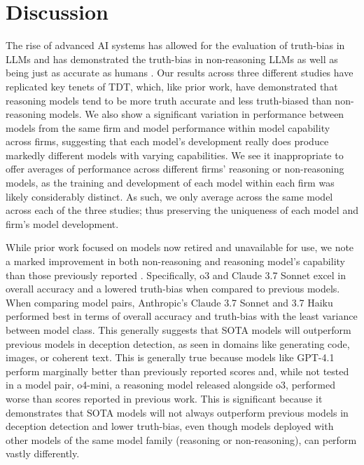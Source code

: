 \documentclass{article}
\begin{document}
\section{Discussion}
\label{sec:discussion}

The rise of advanced AI systems has allowed for the evaluation of truth-bias in LLMs and has demonstrated the truth-bias in non-reasoning LLMs as well as being just as accurate as humans \citep{markowitz_generative_2024}. Our results across three different studies have replicated key tenets of TDT, which, like prior work, have demonstrated that reasoning models tend to be more truth accurate and less truth-biased than non-reasoning models. We also show a significant variation in performance between models from the same firm and  model performance within model capability across firms, suggesting that each model's development really does produce markedly different models with varying capabilities. We see it inappropriate to offer averages of performance across different firms' reasoning or non-reasoning models, as the training and development of each model within each firm was likely considerably distinct. As such, we only average across the same model across each of the three studies; thus preserving the uniqueness of each model and firm's model development.

While prior work focused on models now retired and unavailable for use, we note a marked improvement in both non-reasoning and reasoning model's capability than those previously reported \citep{markowitz_generative_2024}. Specifically, o3 and Claude 3.7 Sonnet excel in overall accuracy and a lowered truth-bias when compared to previous models. When comparing model pairs, Anthropic's Claude 3.7 Sonnet and 3.7 Haiku performed best in terms of overall accuracy and truth-bias with the least variance between model class. This generally suggests that SOTA models will outperform previous models in deception detection, as seen in domains like generating code, images, or coherent text. This is generally true because models like GPT-4.1 perform marginally better than previously reported scores and, while not tested in a model pair, o4-mini, a reasoning model released alongside o3, performed worse than scores reported in previous work. This is significant because it demonstrates that SOTA models will not always outperform previous models in deception detection and lower truth-bias, even though models deployed with other models of the same model family (reasoning or non-reasoning), can perform vastly differently. 
\end{document}
